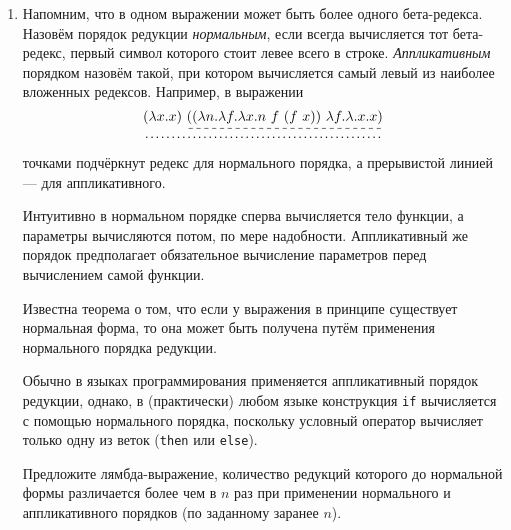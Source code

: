 \documentclass[10pt,a4paper,oneside]{article}
\begin{document}
\begin{enumerate}
\item Напомним, что в одном выражении может быть более одного бета-редекса. Назовём порядок редукции \emph{нормальным},
если всегда вычисляется тот бета-редекс, первый символ которого стоит левее всего в строке. \emph{Аппликативным}
порядком назовём такой, при котором вычисляется самый левый из наиболее вложенных редексов. 
Например, в выражении $$\dotuline{(\lambda x.x)\ \dashuline{((\lambda n.\lambda f.\lambda x.n\ f\ (f\ x))\ \lambda f.\lambda.x.x)}}$$
точками подчёркнут редекс для нормального порядка, а прерывистой линией --- для аппликативного.

Интуитивно в нормальном порядке
сперва вычисляется тело функции, а параметры вычисляются потом, по мере надобности. Аппликативный же порядок
предполагает обязательное вычисление параметров перед вычислением самой функции.

Известна теорема о том, что если у выражения в принципе существует нормальная форма, то она может быть получена
путём применения нормального порядка редукции.

Обычно в языках программирования применяется аппликативный порядок редукции, однако,
в (практически) любом языке конструкция \verb!if! вычисляется с помощью нормального порядка, поскольку условный оператор
вычисляет только одну из веток (\verb!then! или \verb!else!). 

Предложите лямбда-выражение, количество редукций которого до нормальной формы различается более чем в $n$ раз при применении
нормального и аппликативного порядков (по заданному заранее $n$).
\end{enumerate}
\end{document}
